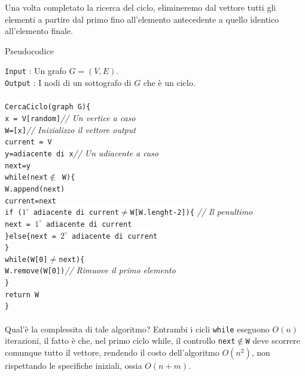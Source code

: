 \documentclass[12pt, letterpaper]{article}
\newcommand{\code}[1]{\colorbox{light-gray}{\texttt{#1}}}
\newcommand{\codee}[1]{\colorbox{white}{\texttt{#1}}}
\newcommand{\acc}{\\\hphantom{}\\}
\begin{document}
Una volta completato la ricerca del ciclo, elimineremo dal vettore tutti gli elementi a partire dal primo
fino all'elemento antecedente a quello identico all'elemento finale. \begin{center}
    Pseudocodice
\end{center}
\code{Input} : Un grafo $G=(V,E)$.\\
\code{Output} : I nodi di un sottografo di \(G\) che è un ciclo.\\\hphantom{}\\
\codee{CercaCiclo(graph G)\{}\\
\hphantom{ident}\codee{x = V[random]}\color{lg}\textit{// Un vertice a caso}\color{black}\\
\hphantom{ident}\codee{W=[x]}\color{lg}\textit{// Inizializzo il vettore output}\color{black}\\
\hphantom{ident}\codee{current = V}\\
\hphantom{ident}\codee{y=adiacente di x}\color{lg}\textit{// Un adiacente a caso}\color{black}\\
\hphantom{ident}\codee{next=y}\\
\hphantom{ident}\codee{while(next$\notin$ W)\{}\\
\hphantom{ident}\hphantom{ident}\codee{W.append(next)}\\
\hphantom{ident}\hphantom{ident}\codee{current=next}\\
\hphantom{ident}\hphantom{ident}\codee{if ($1^\circ$ adiacente di current$\ne$W[W.lenght-2])\{}
\color{lg}\textit{// Il penultimo}\color{black}\\
\hphantom{ident}\hphantom{ident}\hphantom{ident}\codee{next = $1^\circ$ adiacente di current}\\
\hphantom{ident}\hphantom{ident}\codee{\}else\{next = $2^\circ$ adiacente di current}\\
\hphantom{ident}\codee{\}}\\
\hphantom{ident}\codee{while(W[0]$\ne$next)\{}\\
\hphantom{ident}\hphantom{ident}\codee{W.remove(W[0])}\color{lg}\textit{// Rimuove il primo elemento}\color{black}\\
\hphantom{ident}\codee{\}}\\
\hphantom{ident}\codee{return W}\\
\codee{\}}\acc
Qual'è la complessita di tale algoritmo? Entrambi i cicli \code{while} eseguono \(O(n)\) iterazioni, il
fatto è che, nel primo ciclo while, il controllo \code{next$\notin$W} deve scorrere comunque tutto il vettore,
rendendo il costo dell'algoritmo \(O(n^2)\), non rispettando le specifiche iniziali, ossia \(O(n+m)\).
\end{document}
